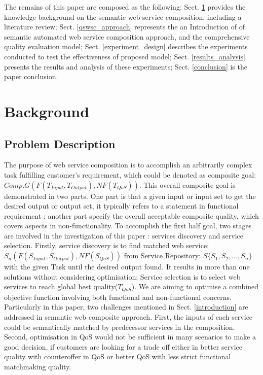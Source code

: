 \documentclass{llncs}
\begin{document}
The remains of this paper are composed as the following: Sect. \ref{background} provides the knowledge background on the semantic web service composition, including a literature review; Sect. \ref{qswsc_approach} represents the an Introduction of of semantic automated web service composition approach, and the comprehensive quality evaluation model; Sect. \ref{experiment_design} describes the experiments conducted to test the effectiveness of proposed model; Sect. \ref{results_analysis} presents the results and analysis of these experiments; Sect. \ref{conclusion} is the paper conclusion.


\section{Background}\label{background}

\subsection{Problem Description}\label{problemDes}

The purpose of web service composition is to accomplish an arbitrarily complex task fulfilling customer's requirement, which could be denoted as composite goal: $Comp.G(F(T_{Input}, T_{Output}), NF(T_{QoS}))$. This overall composite goal is demonstrated in two parts. One part is that a given input or input set to get the desired output or output set, it typically refers to a statement in functional requirement ; another part specify the overall acceptable composite quality, which covers aspects in non-functionality. To accomplish the first half goal, two stages are involved in the investigation of this paper : services discovery and service selection. Firstly, service discovery is to find matched web service: $S_{n}(F(S_{Input}, S_{Output}), NF(S_{QoS}))$ from Service Repository: $S \{S_{1}, S_{2},..., S_{n} \}$ with the given Task until the desired output found. It results in more than one solutions without considering optimisation; Service selection is to select web services to reach global best quality($T_{QoS}$). We are aiming to optimise a combined objective function involving both functional and non-functional concerns. Particularly in this paper, two challenges mentioned in Sect. \ref{introduction} are addressed in semantic web composite approach. First, the inputs of each service could be semantically matched by predecessor services in the composition. Second, optimisation in QoS would not be sufficient in many scenarios to make a good decision, if customers are looking for a trade off either in better service quality with counteroffer in QoS or better QoS with less strict functional matchmaking quality.
\end{document}

